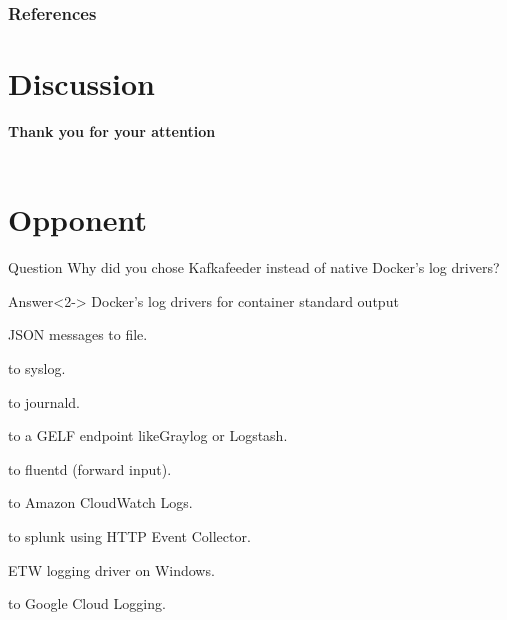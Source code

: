 		\begin{frame}[t,allowframebreaks]
			\frametitle{References}
				
        
		\end{frame}

\section{Discussion}
		\begin{frame}
			\begin{center}
				\vspace*{1cm}
				{\bf Thank you for your attention}\\
				\vspace*{2cm}
				{\bf\Large \FirstName{} \LastName{}}\\
				{\tt \Email}
				\vspace*{1cm}
			\end{center}
			\vfill
		\end{frame}

\appendix
	\section{Opponent}
			\begin{frame}
				\begin{block}{Question}
					Why did you chose Kafkafeeder instead of native Docker's log drivers?
				\end{block}
				\begin{exampleblock}{Answer}<2->
          Docker's log drivers for container standard output \cite{docker-logs}
					\begin{description}	
            \item<2-> [json-file] JSON messages to file. 
            \item<4-> [syslog] to syslog. 
            \item<6-> [journald] to journald. 
            \item<8-> [gelf] to a GELF endpoint likeGraylog or Logstash. 
            \item<10-> [fluentd] to fluentd (forward input). 
            \item<12-> [awslogs] to Amazon CloudWatch Logs. 
            \item<14-> [splunk] to splunk using HTTP Event Collector. 
            \item<16-> [etwlogs] ETW logging driver on Windows.  
            \item<18-> [gcplogs] to Google Cloud Logging. 
					\end{description}
				\end{exampleblock}
			\end{frame}
      

